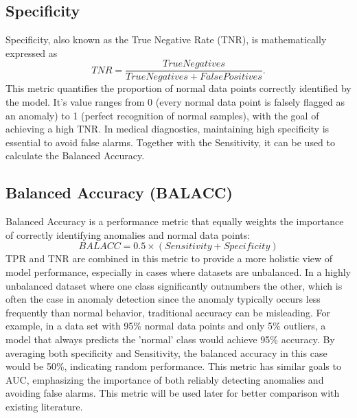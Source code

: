 \subsection{Specificity}
Specificity, also known as the True Negative Rate (TNR), is mathematically expressed as \[ TNR=\frac{TrueNegatives}{TrueNegatives+FalsePositives} .\] This metric quantifies the proportion of normal data points correctly identified by the model. It's value ranges from 0 (every normal data point is falsely flagged as an anomaly) to 1 (perfect recognition of normal samples), with the goal of achieving a high TNR. In medical diagnostics, maintaining high specificity is essential to avoid false alarms. Together with the Sensitivity, it can be used to calculate the Balanced Accuracy.

\subsection{Balanced Accuracy (BALACC)}
Balanced Accuracy is a performance metric that equally weights the importance of correctly identifying anomalies and normal data points: \[ BALACC=0.5 \times (Sensitivity + Specificity) \] TPR and TNR are combined in this metric to provide a more holistic view of model performance, especially in cases where datasets are unbalanced. In a highly unbalanced dataset where one class significantly outnumbers the other, which is often the case in anomaly detection since the anomaly typically occurs less frequently than normal behavior, traditional accuracy can be misleading. For example, in a data set with 95\% normal data points and only 5\% outliers, a model that always predicts the 'normal' class would achieve 95\% accuracy. By averaging both specificity and Sensitivity, the balanced accuracy in this case would be 50\%, indicating random performance. This metric has similar goals to AUC, emphasizing the importance of both reliably detecting anomalies and avoiding false alarms. This metric will be used later for better comparison with existing literature.

